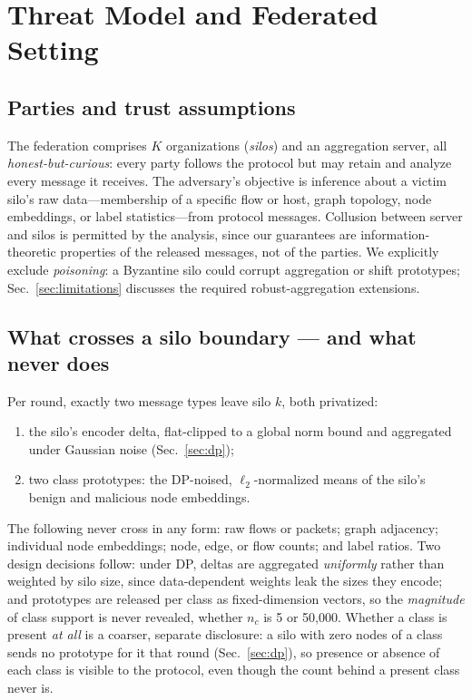 \documentclass[journal]{IEEEtran}
\begin{document}
\section{Threat Model and Federated Setting}
\label{sec:setting}

\subsection{Parties and trust assumptions}
The federation comprises $K$ organizations (\emph{silos}) and an
aggregation server, all \emph{honest-but-curious}: every party follows
the protocol but may retain and analyze every message it receives.
The adversary's objective is inference about a victim silo's raw
data---membership of a specific flow or host, graph topology, node
embeddings, or label statistics---from protocol messages. Collusion
between server and silos is permitted by the analysis, since our
guarantees are information-theoretic properties of the released
messages, not of the parties. We explicitly exclude \emph{poisoning}:
a Byzantine silo could corrupt aggregation or shift prototypes;
Sec.~\ref{sec:limitations} discusses the required robust-aggregation
extensions.

\subsection{What crosses a silo boundary --- and what never does}
Per round, exactly two message types leave silo $k$, both privatized:
\begin{enumerate}
\item the silo's encoder delta, flat-clipped to a global norm bound
and aggregated under Gaussian noise (Sec.~\ref{sec:dp});
\item two class prototypes: the DP-noised, $\ell_2$-normalized means
of the silo's benign and malicious node embeddings.
\end{enumerate}
The following never cross in any form: raw flows or packets; graph
adjacency; individual node embeddings; node, edge, or flow counts; and
label ratios. Two design decisions follow: under DP, deltas are
aggregated \emph{uniformly} rather than weighted by silo size, since
data-dependent weights leak the sizes they encode; and prototypes are
released per class as fixed-dimension vectors, so the \emph{magnitude}
of class support is never revealed, whether $n_c$ is 5 or 50{,}000.
Whether a class is present \emph{at all} is a coarser, separate
disclosure: a silo with zero nodes of a class sends no prototype for
it that round (Sec.~\ref{sec:dp}), so presence or absence of each
class is visible to the protocol, even though the count behind a
present class never is.
\end{document}
